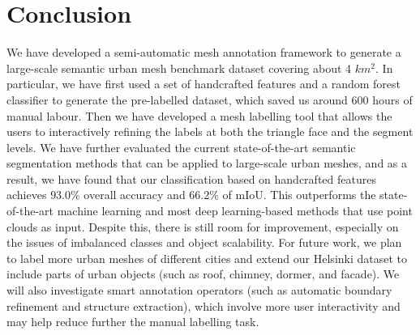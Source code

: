 \section{Conclusion}\label{sec:Discussion}
We have developed a semi-automatic mesh annotation framework to generate a large-scale semantic urban mesh benchmark dataset covering about 4 $km^2$. 
In particular, we have first used a set of handcrafted features and a random forest classifier to generate the pre-labelled dataset, which saved us around 600 hours of manual labour. 
Then we have developed a mesh labelling tool that allows the users to interactively refining the labels at both the triangle face and the segment levels.
We have further evaluated the current state-of-the-art semantic segmentation methods that can be applied to large-scale urban meshes, and as a result, we have found that our classification based on handcrafted features achieves $93.0\%$ overall accuracy and $66.2\%$ of mIoU.
This outperforms the state-of-the-art machine learning and most deep learning-based methods that use point clouds as input.
Despite this, there is still room for improvement, especially on the issues of imbalanced classes and object scalability. 
For future work, we plan to label more urban meshes of different cities and extend our Helsinki dataset to include parts of urban objects (such as roof, chimney, dormer, and facade). 
We will also investigate smart annotation operators (such as automatic boundary refinement and structure extraction), which involve more user interactivity and may help reduce further the manual labelling task.